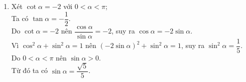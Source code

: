 \begin{bt}
{\begin{enumerate}
\begin{itemize}
				\item Do $-\dfrac{\pi}{2}<\alpha<0$ nên $\cos \alpha>0$.\\
				Từ đó ta có $\cos \alpha=\dfrac{\sqrt{10}}{10}$.
				\item Do $-\pi<\alpha<-\dfrac{\pi}{2}$ nên $\cos \alpha<0$.\\
				Từ đó ta có $\cos \alpha=-\dfrac{\sqrt{10}}{10}$.
			\end{itemize}
			\item Xét $\cot \alpha=-2$ với $0<\alpha<\pi$;\\
			Ta có $\tan \alpha=-\dfrac{1}{2}$.\\
			Do $\cot \alpha=-2$ nên $\dfrac{\cos \alpha}{\sin \alpha}=-2$, suy ra $\cos \alpha=-2\sin \alpha$.\\
			Vì $\cos^2\alpha+\sin^2\alpha=1$ nên $(-2\sin \alpha)^2+\sin^2\alpha=1$, suy ra $\sin^2 \alpha=\dfrac{1}{5}$.\\
			Do $0<\alpha<\pi$ nên $\sin \alpha>0$.\\
			Từ đó ta có $\sin \alpha=\dfrac{\sqrt{5}}{5}$.
		\end{enumerate}
	}
\end{bt}

